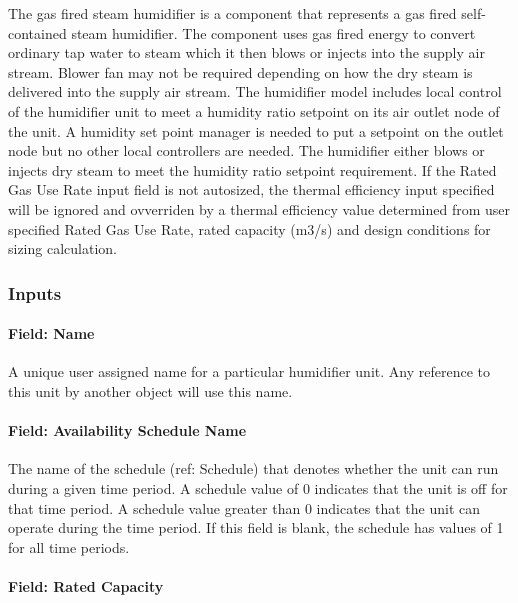 The gas fired steam humidifier is a component that represents a gas fired self-contained steam humidifier. The component uses gas fired energy to convert ordinary tap water to steam which it then blows or injects into the supply air stream. Blower fan may not be required depending on how the dry steam is delivered into the supply air stream. The humidifier model includes local control of the humidifier unit to meet a humidity ratio setpoint on its air outlet node of the unit. A humidity set point manager is needed to put a setpoint on the outlet node but no other local controllers are needed. The humidifier either blows or injects dry steam to meet the humidity ratio setpoint requirement. If the Rated Gas Use Rate input field is not autosized, the thermal efficiency input specified will be ignored and ovverriden by a thermal efficiency value determined from user specified Rated Gas Use Rate, rated capacity (m3/s) and design conditions for sizing calculation.

\subsubsection{Inputs}\label{inputs-1-021}

\paragraph{Field: Name}\label{field-name-1-020}

A unique user assigned name for a particular humidifier unit. Any reference to this unit by another object will use this name.

\paragraph{Field: Availability Schedule Name}\label{field-availability-schedule-name-1-008}

The name of the schedule (ref: Schedule) that denotes whether the unit can run during a given time period. A schedule value of 0 indicates that the unit is off for that time period. A schedule value greater than 0 indicates that the unit can operate during the time period. If this field is blank, the schedule has values of 1 for all time periods.

\paragraph{Field: Rated Capacity}\label{field-rated-capacity-1}

